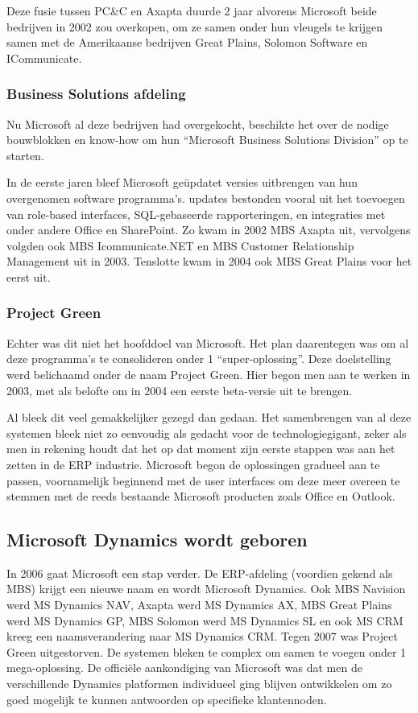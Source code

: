 Deze fusie tussen PC\&C en Axapta duurde 2 jaar alvorens Microsoft beide bedrijven in 2002 zou overkopen, om ze samen onder hun vleugels te krijgen samen met de Amerikaanse bedrijven Great Plains,  Solomon Software en ICommunicate. 

\subsubsection{Business Solutions afdeling}
Nu Microsoft al deze bedrijven had overgekocht, beschikte het over de nodige bouwblokken en know-how om hun “Microsoft Business Solutions Division” op te starten. 

In de eerste jaren bleef Microsoft geüpdatet versies uitbrengen van hun overgenomen software programma’s. updates bestonden vooral uit het toevoegen van role-based interfaces, SQL-gebaseerde rapporteringen, en integraties met onder andere Office en SharePoint.  Zo kwam in 2002 MBS Axapta uit, vervolgens volgden ook MBS Icommunicate.NET en MBS Customer Relationship Management uit in 2003. Tenslotte kwam in 2004 ook MBS Great Plains voor het eerst uit. 

\subsubsection{Project Green }
Echter was dit niet het hoofddoel van Microsoft. Het plan daarentegen was om al deze programma’s te consolideren onder 1 “super-oplossing”. Deze doelstelling werd belichaamd onder de naam Project Green. Hier begon men aan te werken in 2003, met als belofte om in 2004 een eerste beta-versie uit te brengen. 

Al bleek dit veel gemakkelijker gezegd dan gedaan. Het samenbrengen van al deze systemen bleek niet zo eenvoudig als gedacht voor de technologiegigant, zeker als men in rekening houdt dat het op dat moment zijn eerste stappen was aan het zetten in de ERP industrie. Microsoft begon de oplossingen gradueel aan te passen, voornamelijk beginnend met de user interfaces om deze meer overeen te stemmen met de reeds bestaande Microsoft producten zoals Office en Outlook. 


\subsection{Microsoft Dynamics wordt geboren}
In 2006 gaat Microsoft een stap verder. De ERP-afdeling (voordien gekend als MBS) krijgt een nieuwe naam en wordt Microsoft Dynamics. Ook MBS Navision werd MS Dynamics NAV, Axapta werd MS Dynamics AX, MBS Great Plains werd MS Dynamics GP, MBS Solomon werd MS Dynamics SL en ook MS CRM kreeg een naamsverandering naar MS Dynamics CRM. 
Tegen 2007 was Project Green uitgestorven. De systemen bleken te complex om samen te voegen onder 1 mega-oplossing. De officiële aankondiging van Microsoft was dat men de verschillende Dynamics platformen individueel ging blijven ontwikkelen om zo goed mogelijk te kunnen antwoorden op specifieke klantennoden. 


